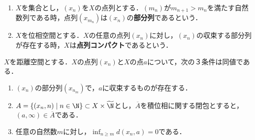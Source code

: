 \documentclass[uplatex,dvipdfmx]{jsreport}
\begin{document}
\begin{definition}\mbox{}
    \begin{enumerate}
        \item $X$を集合とし，$(x_n)$を$X$の点列とする．$(m_n)$が$m_{n+1}>m_n$を満たす自然数列である時，点列$(x_{m_n})$は$(x_n)$の\textbf{部分列}であるという．
        \item $X$を位相空間とする．$X$の任意の点列$(x_n)$に対し，$(x_n)$の収束する部分列が存在する時，$X$は\textbf{点列コンパクト}であるという．
    \end{enumerate}
\end{definition}

\begin{lemma}[部分列が収束することの特徴付け]\label{lemma-部分列が収束することの特徴付け}
    $X$を距離空間とする．$X$の点列$(x_n)$と$X$の点$a$について，次の３条件は同値である．
    \begin{enumerate}
        \item $(x_n)$の部分列$(x_{n_m})$で，$a$に収束するものが存在する．
        \item $A=\{(x_n,n)\mid n\in\N\}\subset X\times\widetilde{\N}$とし，$\overline{A}$を積位相に関する閉包とすると，$(a,\infty)\in\overline{A}$である．
        \item 任意の自然数$m$に対し，$\inf_{n\ge m}d(x_n,a)=0$である．
    \end{enumerate}
\end{lemma}
\end{document}

